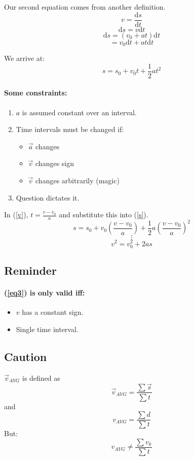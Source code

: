 \documentclass[letterpaper]{article}
\begin{document}
Our second equation comes from another definition.
\[
    v = \frac{\text{d}s}{\text{d}t}
\]
\[
    \text{d}s = v\text{d}t
\]
\[
    \text{d}s = (v_0 + at)\text{d}t
\]
\[
    = v_0\text{d}t + at\text{d}t
\]

We arrive at:
\begin{equation} \label{s}
    s = s_0 + v_0 t + \frac{1}{2}at^2
\end{equation}
\paragraph*{Some constraints:}
\begin{enumerate}
    \item $a$ is assumed constant over an interval.
    \item Time intervals must be changed if:
    \begin{itemize}
        \item $\vec{a}$ changes
        \item $\vec{v}$ changes sign
        \item $\vec{v}$ changes arbitrarily (magic)
    \end{itemize}
    \item Question dictates it.
\end{enumerate}
\newpage
In (\ref{v}), $t = \frac{v - v_0}{a}$ and substitute this into (\ref{s}).
\[
    s = s_0 + v_0 \left(\frac{v - v_0}{a}\right) + 
    \frac{1}{2} a \left( \frac{v - v_0}{a}\right) ^ 2
\]
\[
    \vdots
\]
\begin{equation} \label{eq3}
    v^2 = v_0^2 + 2as
\end{equation}
\subsection{Reminder}
\paragraph*{(\ref{eq3}) is only valid iff:}
    \begin{itemize}
        \item $v$ has a constant sign.
        \item Single time interval.
    \end{itemize}
\subsection{Caution}
$\vec{v}_{AVG}$ is defined as 
\[
\vec{v}_{AVG} = \frac{\sum{\vec{s}}}{\sum{t}}
\]
and
\[
    v_{AVG} = \frac{\sum{d}}{\sum{t}}
\]
But:
\[
    v_{AVG} \neq \frac{\sum{v_k}}{\sum{t}}
\]
\end{document}

